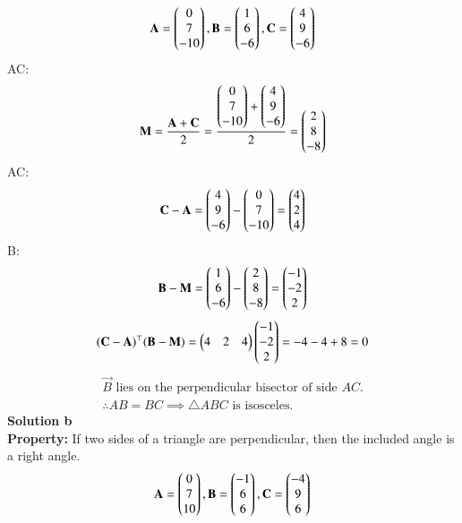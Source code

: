 \documentclass[journal]{IEEEtran}
\begin{document}
\begin{align}
\mathbf{A} = \begin{pmatrix}0\\7\\-10\end{pmatrix},  
\mathbf{B} = \begin{pmatrix}1\\6\\-6\end{pmatrix},  
\mathbf{C} = \begin{pmatrix}4\\9\\-6\end{pmatrix}
\end{align}
 AC: 
\begin{align}
 \mathbf{M} = \frac{\mathbf{A}+\mathbf{C}}{2} 
= \frac{\begin{pmatrix}0\\7\\-10\end{pmatrix}+\begin{pmatrix}4\\9\\-6\end{pmatrix}}{2} 
= \begin{pmatrix}2\\8\\-8\end{pmatrix}
\end{align}
 AC: 
\begin{align}
 \mathbf{C}-\mathbf{A} = \begin{pmatrix}4\\9\\-6\end{pmatrix}-\begin{pmatrix}0\\7\\-10\end{pmatrix} 
= \begin{pmatrix}4\\2\\4\end{pmatrix}
\end{align}
 B:
\begin{align}
\mathbf{B}-\mathbf{M} = \begin{pmatrix}1\\6\\-6\end{pmatrix}-\begin{pmatrix}2\\8\\-8\end{pmatrix} 
= \begin{pmatrix}-1\\-2\\2\end{pmatrix}
\end{align}
\begin{align}
(\mathbf{C}-\mathbf{A})^\top(\mathbf{B}-\mathbf{M}) 
= \begin{pmatrix}4&2&4\end{pmatrix}\begin{pmatrix}-1\\-2\\2\end{pmatrix} = -4-4+8=0
\end{align}
\begin{align*}
 \vec{B} \text{ lies on the perpendicular bisector of side } AC.\\
 \therefore AB = BC \implies \triangle ABC \text{ is isosceles.}
\end{align*}
\textbf{Solution b}\\
\textbf{Property:} If two sides of a triangle are perpendicular, then the included angle is a right angle.
\begin{align}
\mathbf{A} = \begin{pmatrix}0\\7\\10\end{pmatrix},  
\mathbf{B} = \begin{pmatrix}-1\\6\\6\end{pmatrix},  
\mathbf{C} = \begin{pmatrix}-4\\9\\6\end{pmatrix}
\end{align}
\end{document}
